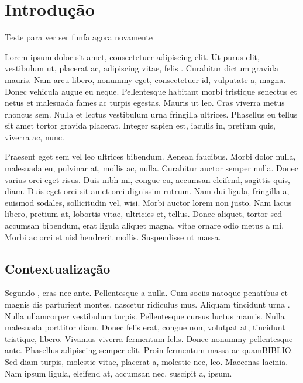%
%

\chapter{Introdu\c{c}\~{a}o}
Teste para ver ser funfa agora novamente

Lorem ipsum dolor sit amet, consectetuer adipiscing elit. Ut purus elit, vestibulum ut,  placerat ac, adipiscing vitae, felis . Curabitur dictum gravida mauris. Nam arcu libero, nonummy eget, consectetuer id, vulputate a, magna. Donec vehicula augue eu neque. Pellentesque habitant morbi tristique senectus et netus et malesuada fames ac turpis egestas. Mauris ut leo. Cras viverra metus rhoncus sem. Nulla et lectus vestibulum urna fringilla ultrices. Phasellus eu tellus sit amet tortor gravida placerat. Integer sapien est, iaculis in, pretium quis, viverra ac, nunc.

Praesent eget sem vel leo ultrices bibendum. Aenean faucibus. Morbi dolor nulla, malesuada eu, pulvinar at, mollis ac, nulla. Curabitur auctor semper nulla. Donec varius orci eget risus. Duis nibh mi, congue eu, accumsan eleifend, sagittis quis, diam. Duis eget orci sit amet orci dignissim rutrum. Nam dui ligula, fringilla a, euismod sodales, sollicitudin vel, wisi. Morbi auctor lorem non justo. Nam lacus libero, pretium at, lobortis vitae, ultricies et, tellus. Donec aliquet, tortor sed accumsan bibendum, erat ligula aliquet magna, vitae ornare odio metus a mi. Morbi ac orci et nisl hendrerit mollis. Suspendisse ut massa.

\section{Contextualiza\c{c}\~{a}o}
Segundo , cras nec ante. Pellentesque a nulla. Cum sociis natoque penatibus et magnis dis parturient montes, nascetur ridiculus mus. Aliquam tincidunt urna . Nulla ullamcorper vestibulum turpis. Pellentesque cursus luctus mauris. Nulla malesuada porttitor diam. Donec felis erat, congue non, volutpat at, tincidunt tristique, libero. Vivamus viverra fermentum felis. Donec nonummy pellentesque ante. Phasellus adipiscing semper elit. Proin fermentum massa ac quamBIBLIO. Sed diam turpis, molestie vitae, placerat a, molestie nec, leo. Maecenas lacinia. Nam ipsum ligula, eleifend at, accumsan nec, suscipit a, ipsum.

